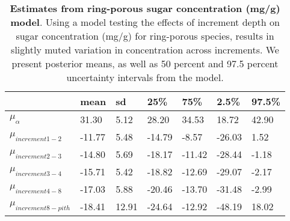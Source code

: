 \documentclass{article}\usepackage[]{graphicx}\usepackage[]{color}
\begin{document}
\begin{table}[ht]
\centering
\caption{\textbf{Estimates from ring-porous sugar concentration (mg/g) model}. Using a model testing the effects of increment depth on sugar concentration (mg/g) for ring-porous species, results in slightly muted variation in concentration across increments. We present posterior means, as well as 50 percent and 97.5 percent uncertainty intervals from the model.} 
\label{tab:lat}
\begingroup\footnotesize
\begin{tabular}{|p{}|p{}|p{}|p{}|p{}|p{}|p{}|}
  \hline
 & mean & sd & 25\% & 75\% & 2.5\% & 97.5\% \\ 
  \hline
$\mu_{\alpha}$ & 31.30 & 5.12 & 28.20 & 34.53 & 18.72 & 42.90 \\ 
  $\mu_{increment 1-2}$ & -11.77 & 5.48 & -14.79 & -8.57 & -26.03 & 1.52 \\ 
  $\mu_{increment 2-3}$ & -14.80 & 5.69 & -18.17 & -11.42 & -28.44 & -1.18 \\ 
  $\mu_{increment 3-4}$ & -15.71 & 5.42 & -18.82 & -12.69 & -29.07 & -2.17 \\ 
  $\mu_{increment 4-8}$ & -17.03 & 5.88 & -20.46 & -13.70 & -31.48 & -2.99 \\ 
  $\mu_{increment 8-pith}$ & -18.41 & 12.91 & -24.64 & -12.92 & -48.19 & 18.02 \\ 
   \hline
\end{tabular}
\endgroup
\end{table}
\end{document}
